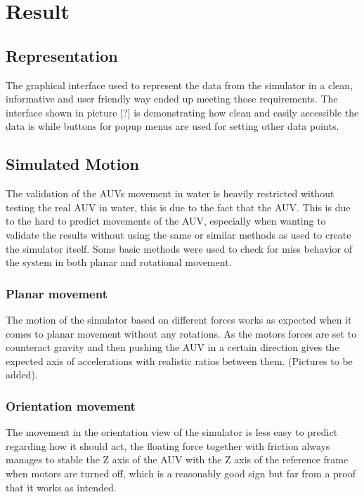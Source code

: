 \section{Result}\label{sec:result}

\subsection{Representation}
The graphical interface used to represent the data from the simulator in a clean, informative and user friendly way ended up meeting those requirements. The interface shown in picture [?] is demonstrating how clean and easily accessible the data is while buttons for popup menus are used for setting other data points.

\subsection{Simulated Motion}
The validation of the AUVs movement in water is heavily restricted without testing the real AUV in water, this is due to the fact that the AUV. This is due to the hard to predict movements of the AUV, especially when wanting to validate the results without using the same or similar methods as used to create the simulator itself. Some basic methods were used to check for miss behavior of the system in both planar and rotational movement.
\subsubsection{Planar movement}
The motion of the simulator based on different forces works as expected when it comes to planar movement without any rotations. As the motors forces are set to counteract gravity and then pushing the AUV in a certain direction gives the expected axis of accelerations with realistic ratios between them.  (Pictures to be added).
\subsubsection{Orientation movement}
The movement in the orientation view of the simulator is less easy to predict regarding how it should act, the floating force together with friction always manages to stable the Z axis of the AUV with the Z axis of the reference frame when motors are turned off, which is a reasonably good sign but far from a proof that it works as intended.

